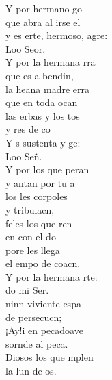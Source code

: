 \documentclass[12pt]{article}
\begin{document}
\begin{multicols*}{2}
\begin{cancion}
	Y por  hermano go\\
	que abra al irse el \\
	y es erte, hermoso, agre:\\
	Loo Seor.\\
	Y por la hermana rra\\
	que es a bendin, \\
	la heana madre erra\\
	que  en toda ocan \\
	las erbas y los tos \\
	y res de co\\
	Y s sustenta y ge: \\
	Loo Señ. \\
	Y por los que peran\\
	y antan por tu a\\
	los les corpoles \\
	y  tribulacn,\\
	feles los que ren \\
	en  con el do\\
	pore les llega\\
	el empo de  coacn. \\
	Y por la hermana rte:\\
	do mi Ser.\\
	ninn viviente espa  \\
	de  persecucn;\\
	¡Ay!i en pecadoave\\
	sornde al peca.\\
	Diosos los que mplen \\
	la lun de os.\\

\end{cancion}
\end{multicols*}
\end{document}
